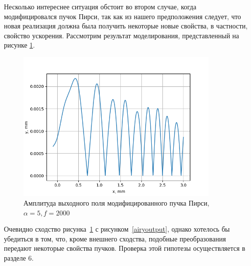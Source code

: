 {    Несколько интереснее ситуация обстоит во втором случае, когда модифицировался пучок Пирси,
    так как из нашего предположения следует, что новая реализация должна была получить некоторые новые свойства,
    в частности, свойство ускорения. Рассмотрим результат моделирования, представленный на рисунке \ref{peodd_output}.
    \begin{figure}[H]
        \begin{center}
            \includegraphics[width=10cm]{plots/peodd_output}
            \caption{Амплитуда выходного поля модифицированного пучка Пирси, $ \alpha  = 5, f = 2000$}
            \label{peodd_output}
        \end{center}
    \end{figure}
    Очевидно сходство рисунка~\ref{peodd_output} с рисунком~\ref{airyoutput}, однако хотелось бы убедиться в том,
    что, кроме внешнего сходства, подобные преобразования передают некоторые свойства пучков.
    Проверка этой гипотезы осуществляется в разделе 6.
    }\label{sec:nohyphens}
    \newpage
